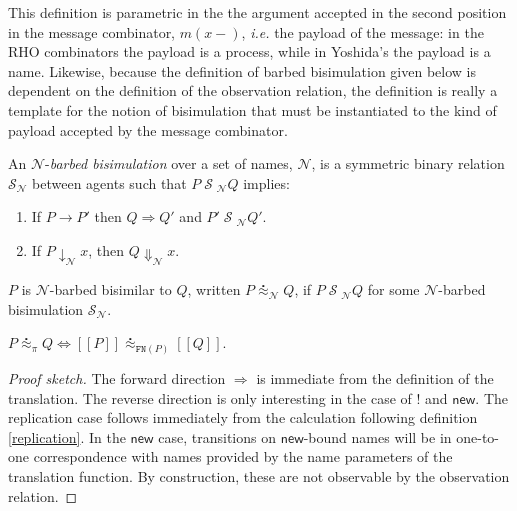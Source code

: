 \documentclass{llncs}
\newcommand{\new}{\mathsf{new}}
\newcommand{\ldb}{[\![}
\newcommand{\rdb}{]\!]}
\newcommand{\wbbisim}{\stackrel{\centerdot}{\approx}} %
\newcommand{\prefix}[3]{#1?(#2) . #3}
\newcommand{\rel}[1]{\;{\mathcal #1}\;} %
\newcommand{\red}{\rightarrow}
\newcommand{\wred}{\Rightarrow}
\newcommand{\rhoc}{$\rho$-calculus}
\begin{document}
This definition is parametric in the the argument accepted in the
second position in the message combinator, $m(x-)$, {\em i.e.} the payload
of the message: in the RHO combinators the payload is a process,
while in Yoshida's the payload is a name. Likewise, because the
definition of barbed bisimulation given below is dependent on the
definition of the observation relation, the definition is really a
template for the notion of bisimulation that must be instantiated to
the kind of payload accepted by the message combinator.


\begin{definition}
An  ${\mathcal N}$-\emph{barbed bisimulation} over a set of names, ${\mathcal N}$, is a symmetric binary relation 
${\mathcal S}_{\mathcal N}$ between agents such that $P\rel{S}_{\mathcal N}Q$ implies:
\begin{enumerate}
\item If $P \red P'$ then $Q \wred Q'$ and $P'\rel{S}_{\mathcal N} Q'$.
\item If $P\downarrow_{\mathcal N} x$, then $Q\Downarrow_{\mathcal N} x$.
\end{enumerate}
$P$ is ${\mathcal N}$-barbed bisimilar to $Q$, written
$P \wbbisim_{\mathcal N} Q$, if $P \rel{S}_{\mathcal N} Q$ for some ${\mathcal N}$-barbed bisimulation ${\mathcal S}_{\mathcal N}$.
\end{definition}

\begin{theorem}
  $P \wbbisim_{\pi} Q \iff \ldb P \rdb \wbbisim_{\texttt{FN}(P)} \ldb Q \rdb$.
\end{theorem}

\begin{proof}[Proof sketch]
  The forward direction $\Rightarrow$ is immediate from the definition
  of the translation. The reverse direction is only interesting in the
  case of $!$ and $\mathsf{new}$. The replication case follows immediately
  from the calculation following definition \ref{replication}. 
  In the $\new$ case, transitions on $\mathsf{new}$-bound
  names will be in one-to-one correspondence with names provided by
  the name parameters of the translation function. By construction,
  these are not observable by the observation relation.
\end{proof}
\end{document}
